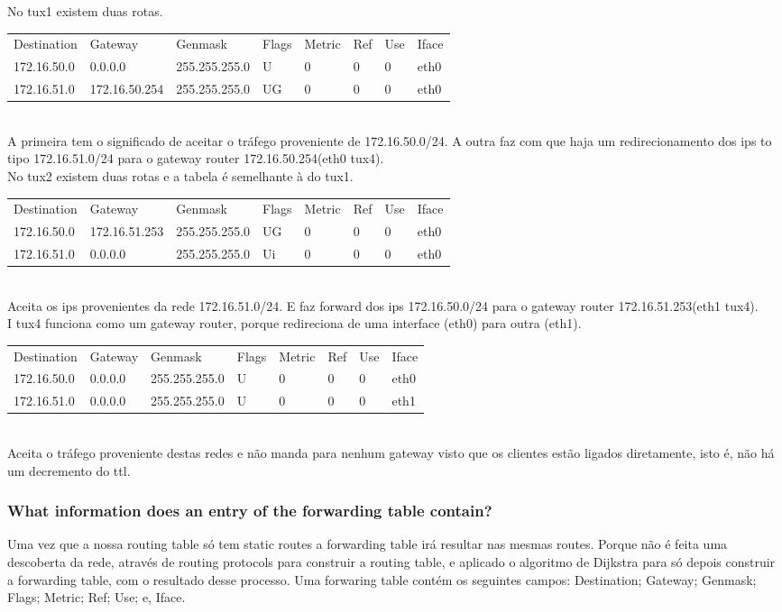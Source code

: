 \documentclass[a4paper]{article}
\begin{document}
No tux1 existem duas rotas.\\
\begin{tabular}{l l l l l l l l}
Destination & Gateway & Genmask & Flags & Metric & Ref & Use & Iface \\
172.16.50.0 & 0.0.0.0 & 255.255.255.0 & U & 0 & 0 & 0 & eth0 \\
172.16.51.0 & 172.16.50.254 & 255.255.255.0 & UG & 0 & 0 & 0 & eth0
\end{tabular}\\
A primeira tem o significado de aceitar o tráfego proveniente de 172.16.50.0/24. A outra faz com que haja um redirecionamento dos ips to tipo 172.16.51.0/24 para o gateway router 172.16.50.254(eth0 tux4).\\

\noindent No tux2 existem duas rotas e a tabela é semelhante à do tux1.\\
\begin{tabular}{l l l l l l l l}
Destination & Gateway & Genmask & Flags & Metric & Ref & Use & Iface \\
172.16.50.0 & 172.16.51.253 & 255.255.255.0 & UG & 0 & 0 & 0 & eth0 \\
172.16.51.0 & 0.0.0.0 & 255.255.255.0 & Ui & 0 & 0 & 0 & eth0
\end{tabular}\\
Aceita os ips provenientes da rede 172.16.51.0/24. E faz forward dos ips 172.16.50.0/24 para o gateway router 172.16.51.253(eth1 tux4).\\

\noindent I tux4 funciona como um gateway router, porque redireciona de uma interface (eth0) para outra (eth1).\\
\begin{tabular}{l l l l l l l l}
Destination & Gateway & Genmask & Flags & Metric & Ref & Use & Iface \\
172.16.50.0 & 0.0.0.0 & 255.255.255.0 & U & 0 & 0 & 0 & eth0 \\
172.16.51.0 & 0.0.0.0 & 255.255.255.0 & U & 0 & 0 & 0 & eth1
\end{tabular}\\
Aceita o tráfego proveniente destas redes e não manda para nenhum gateway visto que os clientes estão ligados diretamente, isto é, não há um decremento do ttl.

\subsubsection{What information does an entry of the forwarding table contain?}
Uma vez que a nossa routing table só tem static routes a forwarding table irá resultar nas mesmas routes. Porque não é feita uma descoberta da rede, através de routing protocols para construir a routing table, e aplicado o algoritmo de Dijkstra para só depois construir a forwarding table, com o resultado desse processo. Uma forwaring table contém os seguintes campos: Destination; Gateway; Genmask; Flags; Metric; Ref; Use; e, Iface.
\end{document}
